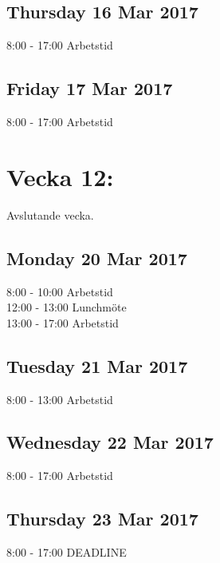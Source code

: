 \documentclass[paper=a4, fontsize=11pt,twoside]{article}
\begin{document}
\subsection*{Thursday 16 Mar 2017}
	8:00 - 17:00 Arbetstid\\
\subsection*{Friday 17 Mar 2017}
	8:00 - 17:00 Arbetstid\\



\section*{Vecka 12:}
Avslutande vecka.\\
\subsection*{Monday 20 Mar 2017}
	8:00 - 10:00 Arbetstid\\
	12:00 - 13:00 Lunchmöte\\
	13:00 - 17:00 Arbetstid\\
\subsection*{Tuesday 21 Mar 2017}
	8:00 - 13:00 Arbetstid\\
\subsection*{Wednesday 22 Mar 2017}
	8:00 - 17:00 Arbetstid\\
\subsection*{Thursday 23 Mar 2017}
	8:00 - 17:00 DEADLINE\\
\end{document}

